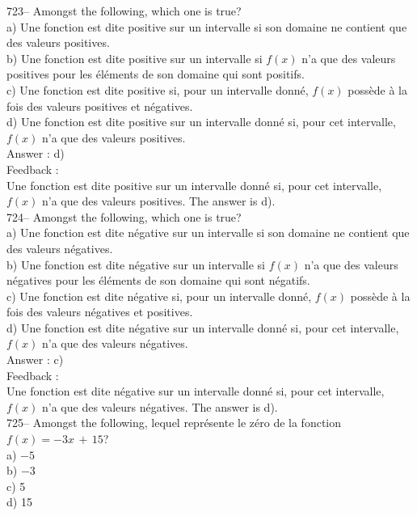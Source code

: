 \documentclass[letterpaper, 12pt]{article}
\begin{document}
723-- Amongst the following, which one is true?\\
a) Une fonction est dite positive sur un intervalle si son domaine ne
contient que des valeurs positives.\\
b) Une fonction est dite positive sur un intervalle si $f(x)$ n'a que des
valeurs positives pour les \'el\'ements de son domaine qui sont positifs.\\
c) Une fonction est dite positive si, pour un intervalle donn\'e, $f(x)$
poss\`ede \`a la fois des valeurs positives et n\'egatives.\\
d) Une fonction est dite positive sur un intervalle donn\'e si, pour cet
intervalle, $f(x)$ n'a que des valeurs positives.  \\

Answer :  d)\\

Feedback : \\
Une fonction est dite positive sur un intervalle donn\'e si, pour cet
intervalle, $f(x)$ n'a que des valeurs positives. The answer is d).\\

724-- Amongst the following, which one is true?\\
a) Une fonction est dite n\'egative sur un intervalle si son domaine ne
contient que des valeurs n\'egatives.\\
b) Une fonction est dite n\'egative sur un intervalle si $f(x)$ n'a que des
valeurs n\'egatives pour les \'el\'ements de son domaine qui sont
n\'egatifs.\\
c) Une fonction est dite n\'egative si, pour un intervalle donn\'e, $f(x)$
poss\`ede \`a la fois des valeurs n\'egatives et positives.  \\
d) Une fonction est dite n\'egative sur un intervalle donn\'e si, pour cet
intervalle, $f(x)$ n'a que des valeurs n\'egatives.  \\

Answer : c)\\

Feedback : \\
Une fonction est dite n\'egative sur un intervalle donn\'e si, pour cet
intervalle, $f(x)$ n'a que des valeurs n\'egatives.  The answer is d).\\

725-- Amongst the following, lequel repr\'esente le z\'ero de la
fonction $f(x)=-3x\,+\,15$?\\
a) $-5$\\
b) $-3$\\
c) 5\\
d) 15\\
\end{document}
